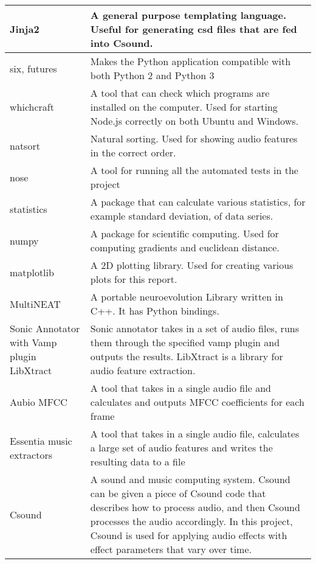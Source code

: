 \begin{center}
\begin{longtable}{p{3.3cm} p{13cm}}
\midrule
Jinja2 & A general purpose templating language. Useful for generating csd files that are fed into Csound. \\
\midrule
six, futures & Makes the Python application compatible with both Python 2 and Python 3 \\
\midrule
whichcraft & A tool that can check which programs are installed on the computer. Used for starting Node.js correctly on both Ubuntu and Windows. \\
\midrule
natsort & Natural sorting. Used for showing audio features in the correct order. \\
\midrule
nose & A tool for running all the automated tests in the project \\
\midrule
statistics & A package that can calculate various statistics, for example standard deviation, of data series. \\
\midrule
numpy & A package for scientific computing. Used for computing gradients and euclidean distance. \\
\midrule
matplotlib & A 2D plotting library. Used for creating various plots for this report. \\
\midrule
MultiNEAT & A portable neuroevolution Library written in C++. It has Python bindings. \\
\midrule
Sonic Annotator with Vamp plugin LibXtract & Sonic annotator takes in a set of audio files, runs them through the specified vamp plugin and outputs the results. LibXtract is a library for audio feature extraction. \\
\midrule
Aubio MFCC & A tool that takes in a single audio file and calculates and outputs MFCC coefficients for each frame \\
\midrule
Essentia music extractors & A tool that takes in a single audio file, calculates a large set of audio features and writes the resulting data to a file \\
\midrule
Csound & A sound and music computing system. Csound can be given a piece of Csound code that describes how to process audio, and then Csound processes the audio accordingly. In this project, Csound is used for applying audio effects with effect parameters that vary over time. \\

\end{longtable}
\end{center}
